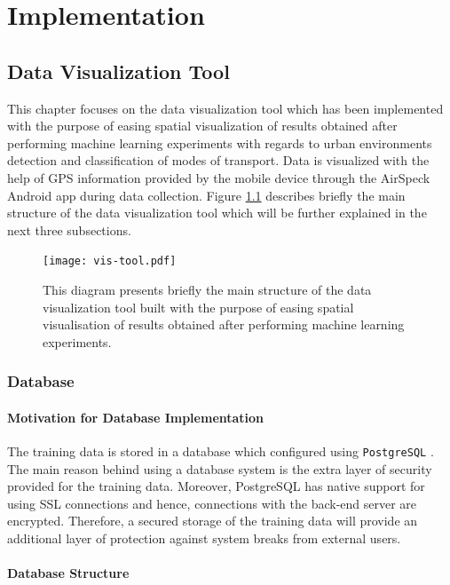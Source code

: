 \documentclass[bsc,frontabs,twoside,singlespacing, parskip,deptreport]{infthesis}     %
\begin{document}
\chapter{Implementation}

\section{Data Visualization Tool}
\label{sec:data-visualization-tool}

This chapter focuses on the data visualization tool which has been implemented with the purpose of easing spatial visualization of results obtained after performing machine learning experiments with regards to urban environments detection and classification of modes of transport. Data is visualized with the help of GPS information provided by the mobile device through the AirSpeck Android app during data collection. Figure \ref{fig:vis-tool} describes briefly the main structure of the data visualization tool which will be further explained in the next three subsections.

\begin{figure}[h!]
  \center
  \texttt{[image: vis-tool.pdf]}
  \caption{This diagram presents briefly the main structure of the data visualization tool built with the purpose of easing spatial visualisation of results obtained after performing machine learning experiments.}
  \label{fig:vis-tool}
\end{figure}


\subsection{Database}
\label{subsec:database}

\subsubsection*{Motivation for Database Implementation}

The training data is stored in a database which configured using \texttt{PostgreSQL} \cite{postgres}. The main reason behind using a database system is the extra layer of security provided for the training data. Moreover, PostgreSQL has native support for using SSL connections and hence, connections with the back-end server are encrypted. Therefore, a secured storage of the training data will provide an additional layer of protection against system breaks from external users.

\subsubsection*{Database Structure}
\end{document}

